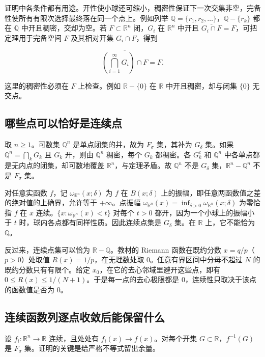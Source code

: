 \documentclass[11pt,a4paper]{article}
\begin{document}
证明中各条件都有用途。开性使小球还可缩小，稠密性保证下一次交集非空，完备性使所有有限次选择最终落在同一个点上。例如列举 \(\mathbb Q=\{r_1,r_2,\ldots\}\)，\(\mathbb Q-\{r_k\}\) 都在 \(\mathbb Q\) 中开且稠密，交却为空。若 \(F\subset\mathbb R^n\) 闭，\(G_i\) 在 \(\mathbb R^n\) 中开且 \(\overline{G_i\cap F}=F\)，可把定理用于完备空间 \(F\) 及其相对开集 \(G_i\cap F\)，得到

\[
\overline{\left(\bigcap_{i=1}^{\infty}G_i\right)\cap F}=F.
\]

这里的稠密性必须在 \(F\) 上检查。例如 \(\mathbb R-\{0\}\) 在 \(\mathbb R\) 中开且稠密，却与闭集 \(\{0\}\) 无交点。

\subsection{哪些点可以恰好是连续点}

取 \(n\ge1\)。可数集 \(\mathbb Q^n\) 是单点闭集的并，故为 \(F_\sigma\) 集，其补为 \(G_\delta\) 集。如果 \(\mathbb Q^n=\bigcap_k G_k\) 且 \(G_k\) 开，则由 \(\mathbb Q^n\) 稠密，每个 \(G_k\) 都稠密。各 \(G_k^c\) 和 \(\mathbb Q^n\) 中各单点都是无内点的闭集，却可数地覆盖 \(\mathbb R^n\)，与定理矛盾。故 \(\mathbb Q^n\) 不是 \(G_\delta\) 集，\(\mathbb R^n-\mathbb Q^n\) 不是 \(F_\sigma\) 集。

对任意实函数 \(f\)，记 \(\omega_{\mathbb R^n}(x;\delta)\) 为 \(f\) 在 \(B(x;\delta)\) 上的振幅，即任意两函数值之差的绝对值的上确界，允许等于 \(+\infty\)。点振幅 \(\omega_{\mathbb R^n}(x)=\inf_{\delta>0}\omega_{\mathbb R^n}(x;\delta)\) 为零恰指 \(f\) 在 \(x\) 连续。\(\{x:\omega_{\mathbb R^n}(x)<t\}\) 对每个 \(t>0\) 都开，因为一个小球上的振幅小于 \(t\) 时，球内各点都有同样性质。因此连续点集是 \(G_\delta\) 集。在 \(\mathbb R\) 上，它不能恰为 \(\mathbb Q\)。

反过来，连续点集可以恰为 \(\mathbb R-\mathbb Q\)。教材的 Riemann 函数在既约分数 \(x=q/p\)（\(p>0\)）处取值 \(R(x)=1/p\)，在无理数处取 \(0\)。任意有界区间中分母不超过 \(N\) 的既约分数只有有限个。给定 \(x_0\)，在它的去心邻域里避开这些点，即有 \(0\le R(x)\le1/(N+1)\)。于是每一点的去心极限都是 \(0\)，连续性只取决于该点的函数值是否为 \(0\)。

\subsection{连续函数列逐点收敛后能保留什么}

设 \(f_i:\mathbb R^n\to\mathbb R\) 连续，且处处有 \(f_i(x)\to f(x)\)。对每个开集 \(G\subset\mathbb R\)，\(f^{-1}(G)\) 是 \(F_\sigma\) 集。证明的关键是给严格不等式留出余量。
\end{document}
